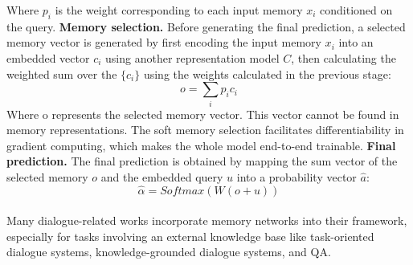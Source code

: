Where $p_i$ is the weight corresponding to each input memory $x_i$ conditioned on the query. 
\textbf{Memory selection.} Before generating the final prediction, a selected memory vector is generated by first encoding the input memory $x_i$ into an embedded vector $c_i$ using another representation model $C$, then calculating the weighted sum over the $\{c_i\}$ using the weights calculated in the previous stage: 
\begin{equation}
o = \sum_i p_ic_i
\end{equation}
Where o represents the selected memory vector. This vector cannot be found in memory representations. The soft memory selection facilitates differentiability in gradient computing, which makes the whole model end-to-end trainable. 
\textbf{Final prediction.} The final prediction is obtained by mapping the sum vector of the selected memory $o$ and the embedded query $u$ into a probability vector $\hat{a}$:
\begin{equation}
\hat{\alpha} = Softmax(W(o+u))
\end{equation}
\\
Many dialogue-related works incorporate memory networks into their framework, especially for tasks involving an external knowledge base like task-oriented dialogue systems, knowledge-grounded dialogue systems, and QA.
